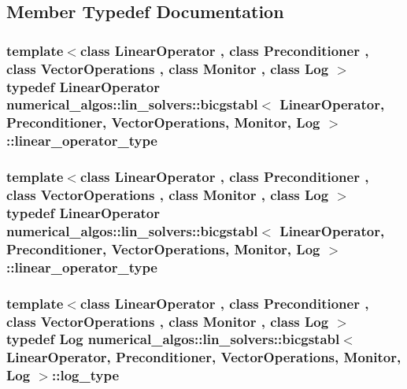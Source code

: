 \subsection{Member Typedef Documentation}
\hypertarget{classnumerical__algos_1_1lin__solvers_1_1bicgstabl_a01e654bee784fc6e5fae7b02dd408523}{
\subsubsection[{linear\-\_\-operator\-\_\-type}]{\setlength{\rightskip}{0pt plus 5cm}template$<$class Linear\-Operator , class Preconditioner , class Vector\-Operations , class Monitor , class Log $>$ typedef Linear\-Operator {\bf numerical\-\_\-algos\-::lin\-\_\-solvers\-::bicgstabl}$<$ Linear\-Operator, Preconditioner, Vector\-Operations, Monitor, Log $>$\-::{\bf linear\-\_\-operator\-\_\-type}}}\label{classnumerical__algos_1_1lin__solvers_1_1bicgstabl_a01e654bee784fc6e5fae7b02dd408523}
\hypertarget{classnumerical__algos_1_1lin__solvers_1_1bicgstabl_a01e654bee784fc6e5fae7b02dd408523}{
\subsubsection[{linear\-\_\-operator\-\_\-type}]{\setlength{\rightskip}{0pt plus 5cm}template$<$class Linear\-Operator , class Preconditioner , class Vector\-Operations , class Monitor , class Log $>$ typedef Linear\-Operator {\bf numerical\-\_\-algos\-::lin\-\_\-solvers\-::bicgstabl}$<$ Linear\-Operator, Preconditioner, Vector\-Operations, Monitor, Log $>$\-::{\bf linear\-\_\-operator\-\_\-type}}}\label{classnumerical__algos_1_1lin__solvers_1_1bicgstabl_a01e654bee784fc6e5fae7b02dd408523}
\hypertarget{classnumerical__algos_1_1lin__solvers_1_1bicgstabl_af655ab52679d5d959cccf86e56a33d63}{
\subsubsection[{log\-\_\-type}]{\setlength{\rightskip}{0pt plus 5cm}template$<$class Linear\-Operator , class Preconditioner , class Vector\-Operations , class Monitor , class Log $>$ typedef Log {\bf numerical\-\_\-algos\-::lin\-\_\-solvers\-::bicgstabl}$<$ Linear\-Operator, Preconditioner, Vector\-Operations, Monitor, Log $>$\-::{\bf log\-\_\-type}}}\label{classnumerical__algos_1_1lin__solvers_1_1bicgstabl_af655ab52679d5d959cccf86e56a33d63}
